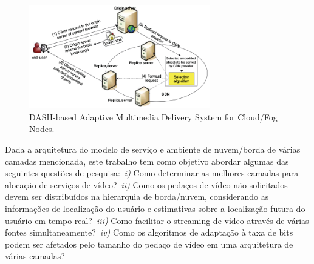 
\vspace{0.8cm}
\begin{figure}[htpb]
	\centering
	\includegraphics[width=0.7\textwidth]{img/fig-intro.png}
	\caption{DASH-based Adaptive Multimedia Delivery System for Cloud/Fog Nodes.}
	\label{fig:scenario-arch}
\end{figure}

Dada a arquitetura do modelo de serviço e ambiente de nuvem/borda de várias camadas mencionada, este trabalho tem como objetivo abordar algumas das seguintes questões de pesquisa:~\textit{i)} Como determinar as melhores camadas para alocação de serviços de vídeo?~\textit{ii)} Como os pedaços de vídeo não solicitados devem ser distribuídos na hierarquia de borda/nuvem, considerando as informações de localização do usuário e estimativas sobre a localização futura do usuário em tempo real?~\textit{iii)} Como facilitar o streaming de vídeo através de várias fontes simultaneamente?~\textit{iv)} Como os algoritmos de adaptação à taxa de bits podem ser afetados pelo tamanho do pedaço de vídeo em uma arquitetura de várias camadas?


